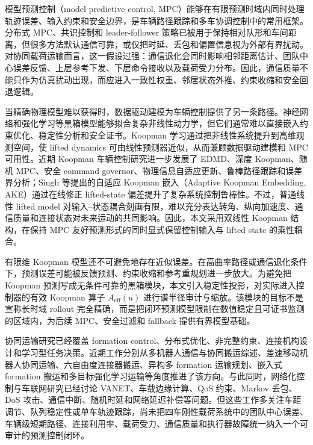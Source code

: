 \documentclass[twocolumn,3p,times,procedia]{elsarticle}
\begin{document}
模型预测控制（model predictive control, MPC）能够在有限预测时域内同时处理轨迹误差、输入约束和安全边界，是车辆路径跟踪和多车协调控制中的常用框架。分布式 MPC、共识控制和 leader-follower 策略已被用于保持相对队形和车间距离，但很多方法默认通信可靠，或仅把时延、丢包和偏置信息视为外部有界扰动。对协同载荷运输而言，这一假设过强：通信退化会同时影响相邻距离估计、团队中心误差反馈、上层参考下发、下层命令接收以及载荷受力分布。因此，通信质量不能只作为仿真扰动出现，而应进入一致性权重、邻居状态外推、约束收缩和安全回退逻辑。

当精确物理模型难以获得时，数据驱动建模为车辆控制提供了另一条路径。神经网络和强化学习等黑箱模型能够拟合复杂非线性动力学，但它们通常难以直接嵌入约束优化、稳定性分析和安全证书。Koopman 学习通过把非线性系统提升到高维观测空间，使 lifted dynamics 可由线性预测器近似，从而兼顾数据驱动建模和 MPC 可用性\cite{brunton2016koopmanControl,korda2018koopmanMpc,xiao2022deepKoopmanVehicle,joglekar2023koopmanExperimental}。近期 Koopman 车辆控制研究进一步发展了 EDMD、深度 Koopman、随机 MPC、安全 command governor、物理信息自适应更新、鲁棒路径跟踪和误差界分析\cite{kim2025ksmpc,chen2024koopmanSafetyGovernor,wang2026deepKoopmanRobustTracking,zhang2025physicsInformedAdaptiveKoopman,chen2024esoDeepKoopman,philipp2023koopmanErrorBounds,cibulka2021koopmanVehicleMpc}；Singh 等提出的自适应 Koopman 嵌入（Adaptive Koopman Embedding, AKE）通过在线修正 lifted-state 偏差提升了复杂系统控制鲁棒性\cite{singh2025adaptiveKoopman}。不过，普通线性 lifted model 对输入--状态耦合刻画有限，难以充分表达转角、纵向加速度、通信质量和连接状态对未来运动的共同影响。因此，本文采用双线性 Koopman 结构，在保持 MPC 友好预测形式的同时显式保留控制输入与 lifted state 的乘性耦合。

有限维 Koopman 模型还不可避免地存在近似误差。在高曲率路径或通信退化条件下，预测误差可能被反馈预测、约束收缩和参考重规划进一步放大。为避免把 Koopman 预测写成无条件可靠的黑箱模块，本文引入稳定性投影，对实际进入控制器的有效 Koopman 算子 $A_{\mathrm{eff}}(u)$ 进行谱半径审计与缩放。该模块的目标不是宣称长时域 rollout 完全精确，而是把闭环预测模型限制在数值稳定且可证书监测的区域内，为后续 MPC、安全过滤和 fallback 提供有界模型基础。

协同运输研究已经覆盖 formation control、分布式优化、非完整约束、连接机构设计和学习型任务决策。近期工作分别从多机器人通信与协同搬运综述、差速移动机器人协同运输、六自由度连接器搬运、异构多 formation 运输规划、嵌入式 formation 搬运和多目标强化学习运输等角度推进了该方向\cite{an2023multiRobotCommTransport,cooperativeTransport2024ras,gong2023sixDofTransport,zhang2024heterogeneousTransport,embeddedFormationTransport2024cep,multiObjectiveTransport2024mechatronics,intelligentCollaborativeTransport2024}。与此同时，网络化控制与车联网研究已经讨论 VANET、车载边缘计算、QoS 约束、Markov 丢包、DoS 攻击、通信中断、随机时延和网络延迟补偿等问题\cite{tan2022mlVehicularDcn,zhao2025blockchainVanetDcn,wu2025drlVecDcn,bian2025markovPacketLossDMPC,dosDMPC2024isa,robustCommunicationLoss2025trb,bai2023robustLongitudinalDMPC,bao2024robustUkfMpc,networkLatencyCav2024sensors,dai2024networkedPredictiveControl}。但这些工作多关注车距调节、队列稳定性或单车轨迹跟踪，尚未把四车刚性载荷系统中的团队中心误差、车辆级短期路径、连接利用率、载荷受力、通信质量和执行器故障统一纳入一个可审计的预测控制闭环。
\end{document}
